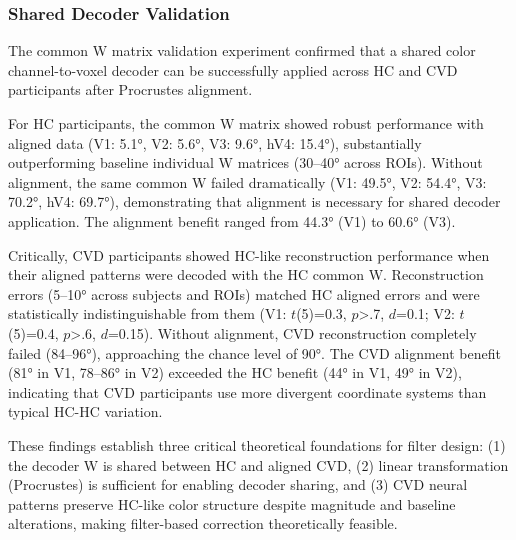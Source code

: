 \documentclass[12pt,a4paper]{article}
\begin{document}
\subsubsection{Shared Decoder Validation}

The common W matrix validation experiment confirmed that a shared color channel-to-voxel decoder can be successfully applied across HC and CVD participants after Procrustes alignment.

For HC participants, the common W matrix showed robust performance with aligned data (V1: 5.1°, V2: 5.6°, V3: 9.6°, hV4: 15.4°), substantially outperforming baseline individual W matrices (30--40° across ROIs). Without alignment, the same common W failed dramatically (V1: 49.5°, V2: 54.4°, V3: 70.2°, hV4: 69.7°), demonstrating that alignment is necessary for shared decoder application. The alignment benefit ranged from 44.3° (V1) to 60.6° (V3).

Critically, CVD participants showed HC-like reconstruction performance when their aligned patterns were decoded with the HC common W. Reconstruction errors (5--10° across subjects and ROIs) matched HC aligned errors and were statistically indistinguishable from them (V1: $t$(5)=0.3, $p$>.7, $d$=0.1; V2: $t$(5)=0.4, $p$>.6, $d$=0.15). Without alignment, CVD reconstruction completely failed (84--96°), approaching the chance level of 90°. The CVD alignment benefit (81° in V1, 78--86° in V2) exceeded the HC benefit (44° in V1, 49° in V2), indicating that CVD participants use more divergent coordinate systems than typical HC-HC variation.

These findings establish three critical theoretical foundations for filter design: (1) the decoder W is shared between HC and aligned CVD, (2) linear transformation (Procrustes) is sufficient for enabling decoder sharing, and (3) CVD neural patterns preserve HC-like color structure despite magnitude and baseline alterations, making filter-based correction theoretically feasible.
\end{document}

